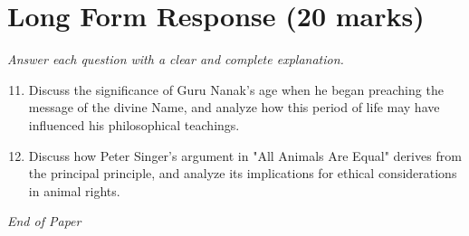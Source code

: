 \documentclass[12pt]{article}
\begin{document}
\section*{Long Form Response (20 marks)}
\textit{Answer each question with a clear and complete explanation.}
\begin{enumerate}[label=\arabic*.]
\setcounter{enumi}{10}
\item Discuss the significance of Guru Nanak's age when he began preaching the message of the divine Name, and analyze how this period of life may have influenced his philosophical teachings.
\item Discuss how Peter Singer's argument in "All Animals Are Equal" derives from the principal principle, and analyze its implications for ethical considerations in animal rights.
\end{enumerate}

\vfill
\noindent\textit{End of Paper}
\end{document}
